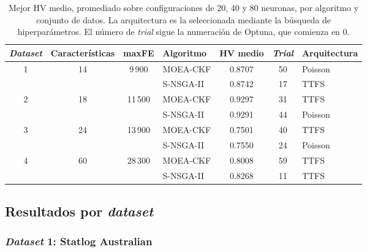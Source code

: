 \begin{table}[htbp]
\centering
\small
\caption{Mejor HV medio, promediado sobre configuraciones de 20, 40 y 80 neuronas, por algoritmo y conjunto de datos. La arquitectura es la seleccionada mediante la búsqueda de hiperparámetros. El número de \textit{trial} sigue la numeración de Optuna, que comienza en 0.}
\label{tab:hv_por_dataset_resultados}
\begin{tabular}{ccclccl}
\hline
\textbf{\textit{Dataset}}            & \textbf{Características}     & \textbf{maxFE}                    & \textbf{Algoritmo} & \textbf{HV medio} & \textbf{\textit{Trial}}& \textbf{Arquitectura} \\ \hline
\multirow{2}{*}{1} & \multirow{2}{*}{14} & \multirow{2}{*}{9\,900}  & MOEA-CKF  & 0.8707   & 50    & Poisson             \\
                   &                     &                          & S-NSGA-II & 0.8742   & 17    & TTFS                \\ \hline
\multirow{2}{*}{2} & \multirow{2}{*}{18} & \multirow{2}{*}{11\,500} & MOEA-CKF  & 0.9297   & 31    & TTFS                \\
                   &                     &                          & S-NSGA-II & 0.9291   & 44    & Poisson             \\ \hline
\multirow{2}{*}{3} & \multirow{2}{*}{24} & \multirow{2}{*}{13\,900} & MOEA-CKF  & 0.7501   & 40    & TTFS                \\
                   &                     &                          & S-NSGA-II & 0.7550   & 24    & Poisson             \\ \hline
\multirow{2}{*}{4} & \multirow{2}{*}{60} & \multirow{2}{*}{28\,300} & MOEA-CKF  & 0.8008   & 59    & TTFS                \\
                   &                     &                          & S-NSGA-II & 0.8268   & 11    & TTFS   \\ \hline            
\end{tabular}
\end{table}

\subsection{Resultados por \textit{dataset}}

\subsubsection{\textit{Dataset} 1: Statlog Australian}

